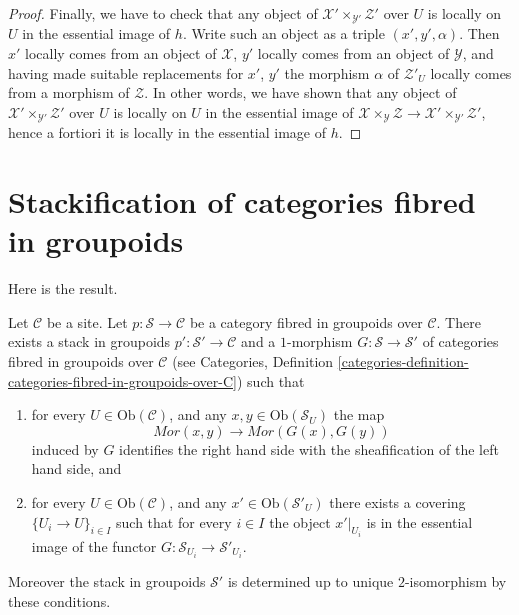 \begin{proof}
\medskip\noindent
Finally, we have to check that any object of
$\mathcal{X}' \times_{\mathcal{Y}'} \mathcal{Z}'$
over $U$ is locally on $U$ in the essential image of $h$.
Write such an object as a triple $(x', y', \alpha)$.
Then $x'$ locally comes from an object of $\mathcal{X}$,
$y'$ locally comes from an object of $\mathcal{Y}$, and
having made suitable replacements for $x'$, $y'$ the morphism
$\alpha$ of $\mathcal{Z}'_U$ locally comes from a morphism of
$\mathcal{Z}$. In other words, we have shown that any object of
$\mathcal{X}' \times_{\mathcal{Y}'} \mathcal{Z}'$
over $U$ is locally on $U$ in the essential image of
$\mathcal{X} \times_{\mathcal{Y}} \mathcal{Z} \to
\mathcal{X}' \times_{\mathcal{Y}'} \mathcal{Z}'$, hence
a fortiori it is locally in the essential image of $h$.
\end{proof}




\section{Stackification of categories fibred in groupoids}
\label{section-stackify-groupoids}

\noindent
Here is the result.

\begin{lemma}
\label{lemma-stackify-groupoids}
Let $\mathcal{C}$ be a site.
Let $p : \mathcal{S} \to \mathcal{C}$ be a category
fibred in groupoids over $\mathcal{C}$.
There exists a stack in groupoids
$p' : \mathcal{S}' \to \mathcal{C}$ and a
$1$-morphism $G : \mathcal{S} \to \mathcal{S}'$
of categories fibred in groupoids over $\mathcal{C}$ (see
Categories, Definition
\ref{categories-definition-categories-fibred-in-groupoids-over-C})
such that
\begin{enumerate}
\item for every $U \in \text{Ob}(\mathcal{C})$, and any
$x, y \in \text{Ob}(\mathcal{S}_U)$ the map
$$
\mathit{Mor}(x, y) \longrightarrow \mathit{Mor}(G(x), G(y))
$$
induced by $G$ identifies the right hand side with the sheafification
of the left hand side, and
\item for every $U \in \text{Ob}(\mathcal{C})$, and any
$x' \in \text{Ob}(\mathcal{S}'_U)$ there exists a covering
$\{U_i \to U\}_{i \in I}$ such that for every $i \in I$ the
object $x'|_{U_i}$ is in the essential image of the
functor $G : \mathcal{S}_{U_i} \to \mathcal{S}'_{U_i}$.
\end{enumerate}
Moreover the stack in groupoids $\mathcal{S}'$ is determined up to unique
$2$-isomorphism by these conditions.
\end{lemma}

